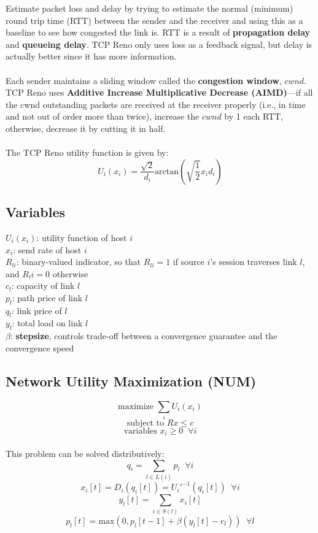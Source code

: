 \documentclass{article}
\newcommand{\MatrixVariable}[1]{\bm{\mathit{#1}}}
\begin{document}
Estimate packet loss and delay by trying to estimate the normal (minimum) round trip time (RTT) between the sender and the receiver and using this as a baseline to see how congested the link is. RTT is a result of \textbf{propagation delay} and \textbf{queueing delay}. TCP Reno only uses loss as a feedback signal, but delay is actually better since it has more information. \\
\\
Each sender maintains a sliding window called the \textbf{congestion window}, $cwnd$. TCP Reno uses \textbf{Additive Increase Multiplicative Decrease (AIMD)}---if all the cwnd outstanding packets are received at the receiver properly (i.e., in time and not out of order more than twice), increase the $cwnd$ by 1 each RTT, otherwise, decrease it by cutting it in half. \\
\\
The TCP Reno utility function is given by:
$$ U_i(x_i) = \frac{\sqrt{2}}{d_i} \text{arctan} \left( \sqrt{\frac{1}{2}} x_i d_i \right) $$

\subsection{Variables}

$U_i(x_i)$: utility function of host $i$ \\
$x_i$: send rate of host $i$ \\
$R_{li}$: binary-valued indicator, so that $R_{li} = 1$ if source $i$'s session traverses link $l$, and $R_li = 0$ otherwise \\
$c_l$: capacity of link $l$ \\
$p_l$: path price of link $l$ \\
$q_l$: link price of $l$ \\
$y_l$: total load on link $l$ \\
$\beta$: \textbf{stepsize}, controls trade-off between a convergence guarantee and the convergence speed

\subsection{Network Utility Maximization (NUM)}

$$ \text{maximize } \sum_i U_i(x_i) $$
$$ \text{subject to } \MatrixVariable{R}\MatrixVariable{x} \leq \MatrixVariable{c} $$
$$ \text{variables } x_i \geq 0 \; \; \forall i $$
\\
This problem can be solved distributively:
$$ q_i = \sum_{l \in L(i)} p_l \; \; \forall i $$
$$ x_i[t] = D_i(q_i[t]) = U_i'^{-1}(q_i[t]) \; \; \forall i $$
$$ y_l[t] = \sum_{i \in S(l)} x_i[t] $$
$$ p_l[t] = \text{max}(0, p_l[t-1] + \beta(y_l[t] - c_l)) \; \; \forall l  $$
\end{document}
